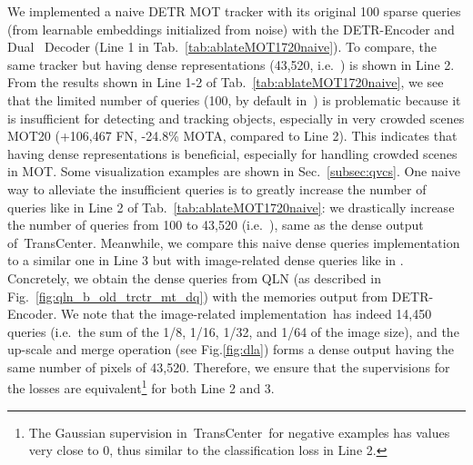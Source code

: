 \begin{table}[ht]
 We implemented a naive DETR MOT tracker with its original 100 sparse queries (from learnable embeddings initialized from noise) with the DETR-Encoder and Dual \method\ Decoder (Line 1 in Tab.~\ref{tab:ablateMOT1720naive}). To compare, the same tracker but having dense representations (43,520, i.e.~) is shown in Line 2. From the results shown in Line 1-2 of Tab.~\ref{tab:ablateMOT1720naive}, we see that the limited number of queries (100, by default in~\cite{zhu2020deformable}) is problematic because it is insufficient for detecting and tracking objects, especially in very crowded scenes MOT20  (+106,467 FN, -24.8\% MOTA, compared to Line 2). This indicates that having dense representations is beneficial, especially for handling crowded scenes in MOT. Some visualization examples are shown in Sec.~\ref{subsec:qvcs}. One naive way to alleviate the insufficient queries is to greatly increase the number of queries like in Line 2 of Tab.~\ref{tab:ablateMOT1720naive}: we drastically increase the number of queries from 100 to 43,520 (i.e.~), same as the dense output of~TransCenter. Meanwhile, we compare this naive dense queries implementation to a similar one in Line 3 but with image-related dense queries like in \method. Concretely, we obtain the dense queries from QLN  (as described in Fig.~\ref{fig:qln_b_old_trctr_mt_dq}) with the memories output from DETR-Encoder. We note that the image-related implementation~has indeed 14,450 queries (i.e.~the sum of the 1/8, 1/16, 1/32, and 1/64 of the image size), and the up-scale and merge operation (see Fig.\ref{fig:dla})
 forms a dense output having the same number of pixels of 43,520. Therefore, we ensure that the supervisions for the losses are equivalent\footnote{The Gaussian supervision in~TransCenter~for negative examples has values very close to 0, thus similar to the classification loss in Line 2.} for both Line 2 and 3.


\end{table}
